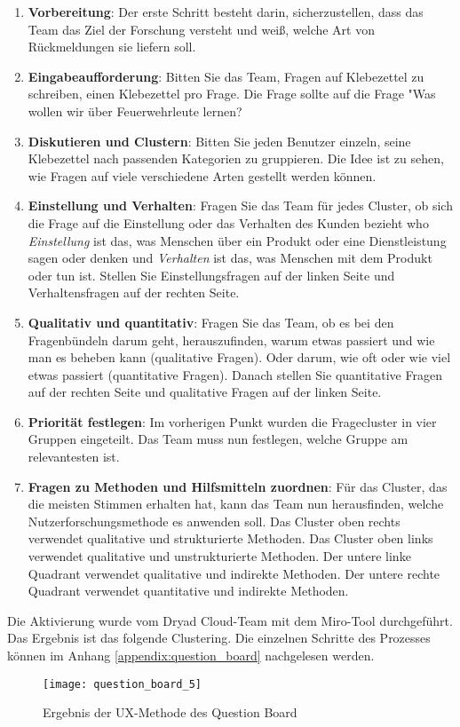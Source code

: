 \begin{enumerate}
  \item \textbf{Vorbereitung}: Der erste Schritt besteht darin, sicherzustellen, dass das Team das Ziel der Forschung versteht und weiß, welche Art von Rückmeldungen sie liefern soll.
  \item \textbf{Eingabeaufforderung}: Bitten Sie das Team, Fragen auf Klebezettel zu schreiben, einen Klebezettel pro Frage. Die Frage sollte auf die Frage "Was wollen wir über Feuerwehrleute lernen?
  \item \textbf{Diskutieren und Clustern}: Bitten Sie jeden Benutzer einzeln, seine Klebezettel nach passenden Kategorien zu gruppieren. Die Idee ist zu sehen, wie Fragen auf viele verschiedene Arten gestellt werden können.
  \item \textbf{Einstellung und Verhalten}: Fragen Sie das Team für jedes Cluster, ob sich die Frage auf die Einstellung oder das Verhalten des Kunden bezieht who \textit{Einstellung} ist das, was Menschen über ein Produkt oder eine Dienstleistung sagen oder denken und \textit{Verhalten} ist das, was Menschen mit dem Produkt oder tun ist. Stellen Sie Einstellungsfragen auf der linken Seite und Verhaltensfragen auf der rechten Seite.
  \item \textbf{Qualitativ und quantitativ}: Fragen Sie das Team, ob es bei den Fragenbündeln darum geht, herauszufinden, warum etwas passiert und wie man es beheben kann (qualitative Fragen). Oder darum, wie oft oder wie viel etwas passiert (quantitative Fragen). Danach stellen Sie quantitative Fragen auf der rechten Seite und qualitative Fragen auf der linken Seite.
  \item \textbf{Priorität festlegen}: Im vorherigen Punkt wurden die Fragecluster in vier Gruppen eingeteilt. Das Team muss nun festlegen, welche Gruppe am relevantesten ist.
  \item \textbf{Fragen zu Methoden und Hilfsmitteln zuordnen}: Für das Cluster, das die meisten Stimmen erhalten hat, kann das Team nun herausfinden, welche Nutzerforschungsmethode es anwenden soll. Das Cluster oben rechts verwendet qualitative und strukturierte Methoden. Das Cluster oben links verwendet qualitative und unstrukturierte Methoden. Der untere linke Quadrant verwendet qualitative und indirekte Methoden. Der untere rechte Quadrant verwendet quantitative und indirekte Methoden.
\end{enumerate}

Die Aktivierung wurde vom Dryad Cloud-Team mit dem Miro-Tool durchgeführt. Das Ergebnis ist das folgende Clustering. Die einzelnen Schritte des Prozesses können im Anhang \ref{appendix:question_board} nachgelesen werden.

\begin{figure}[H]
  \centering
  \texttt{[image: question\_board\_5]}
  \caption{Ergebnis der UX-Methode des Question Board}
  \label{fig:question_board_5_not_appendix}
\end{figure}
